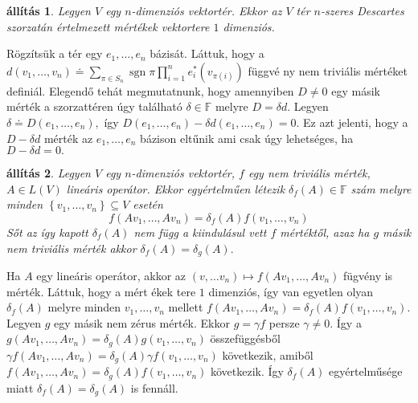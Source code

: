 \documentclass[9pt, a4paper, showtrims]{memoir}
\makeatletter
\renewenvironment{proof}[1][\proofname]
    {\par\pushQED{\qed}%
    \normalfont \topsep6\p@\@plus6\p@\relax
    \trivlist
    \item[\hskip\labelsep
        \itshape
    #1\@addpunct{:}]\ignorespaces}
    {\popQED\endtrivlist\@endpefalse}
\theoremstyle{plain}
\newtheorem{proposition}{állítás}[chapter]
\theoremstyle{remark}
\theoremstyle{definition}
\makeatother
\begin{document}
\begin{proposition}
Legyen $V$ egy $n$-dimenziós vektortér. Ekkor az $V$ tér $n$-szeres
Descartes szorzatán értelmezett mértékek vektortere $1$ dimenziós.
\end{proposition}

\begin{proof}
Rögzítsük a tér egy $e_{1},\ldots ,e_{n}$ bázisát. Láttuk, hogy a $d\left(
v_{1},\ldots ,v_{n}\right) \doteq \sum_{\pi \in S_{n}}\operatorname{sgn}\pi
\prod_{i=1}^{n}e_{i}^{\ast }\left( v_{\pi \left( i\right) }\right) $ függvé%
ny nem triviális mértéket definiál. Elegendő tehát megmutatnunk, hogy
amennyiben $D\neq 0$ egy másik mérték a szorzattéren úgy található $\delta
\in \mathbb{F}$ melyre $D=\delta d.$ Legyen $\delta \doteq D\left( e_{1},\ldots
,e_{n}\right) ,$ így $D\left( e_{1},\ldots ,e_{n}\right) -\delta d\left(
e_{1},\ldots ,e_{n}\right) =0.$ Ez azt jelenti, hogy a $D-\delta d$ mérték
az $e_{1},\ldots ,e_{n}$ bázison eltűnik ami csak úgy lehetséges, ha $%
D-\delta d=0.$
\end{proof}

\begin{proposition}
Legyen $V$ egy $n$-dimenziós vektortér, $f$ egy nem triviális mérték, $A\in
L\left( V\right) $ lineáris operátor. Ekkor egyértelműen létezik $\delta
_{f}\left( A\right) \in \mathbb{F}$ szám melyre minden $\left\{ v_{1},\ldots
,v_{n}\right\} \subseteq V$ esetén 
\[
f\left( Av_{1},\ldots ,Av_{n}\right) =\delta _{f}\left( A\right) f\left(
v_{1},\ldots ,v_{n}\right) 
\]
Sőt az így kapott $\delta _{f}\left( A\right) $ nem függ a kiindulásul vett $%
f$ mértéktől, azaz ha $g$ másik nem triviális mérték akkor $\delta
_{f}\left( A\right) =\delta _{g}\left( A\right) .$
\end{proposition}

\begin{proof}
Ha $A$ egy lineáris operátor, akkor az $\left( v,\ldots v_{n}\right) \mapsto
f\left( Av_{1},\ldots ,Av_{n}\right) $ fügvény is mérték. Láttuk, hogy a mért%
ékek tere $1$ dimenziós, így van egyetlen olyan $\delta _{f}\left( A\right) $
melyre minden $v_{1},\ldots ,v_{n}$ mellett $f\left( Av_{1},\ldots
,Av_{n}\right) =\delta _{f}\left( A\right) f\left( v_{1},\ldots
,v_{n}\right) .$ Legyen $g$ egy másik nem zérus mérték. Ekkor $g=\gamma f$
persze $\gamma \neq 0.$ Így a $g\left( Av_{1},\ldots ,Av_{n}\right) =\delta
_{g}\left( A\right) g\left( v_{1},\ldots ,v_{n}\right) $ összefüggésből $%
\gamma f\left( Av_{1},\ldots ,Av_{n}\right) =\delta _{g}\left( A\right)
\gamma f\left( v_{1},\ldots ,v_{n}\right) $ következik, amiből $f\left(
Av_{1},\ldots ,Av_{n}\right) =\delta _{g}\left( A\right) f\left(
v_{1},\ldots ,v_{n}\right) $ következik. Így $\delta _{f}\left( A\right) $
egyértelműsége miatt $\delta _{f}\left( A\right) =\delta _{g}\left( A\right) 
$ is fennáll.
\end{proof}
\end{document}
